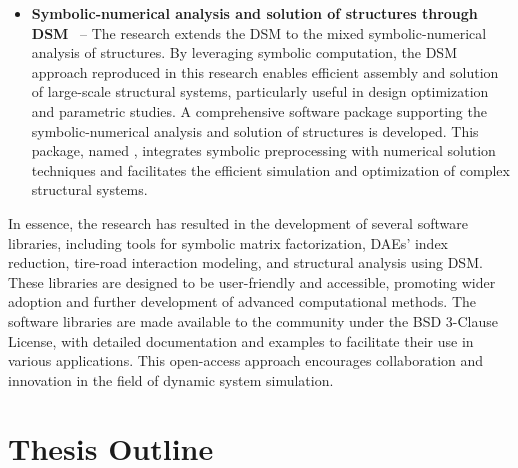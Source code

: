 \begin{itemize}
  \item \textbf{Symbolic-numerical analysis and solution of structures through \ac{DSM}}~\cite{trussme, stocco2024trussme, larcher2024imece_symbolic} -- The research extends the \ac{DSM} to the mixed symbolic-numerical analysis of structures. By leveraging symbolic computation, the \ac{DSM} approach reproduced in this research enables efficient assembly and solution of large-scale structural systems, particularly useful in design optimization and parametric studies. A comprehensive software package supporting the symbolic-numerical analysis and solution of structures is developed. This package, named \TrussMe{}, integrates symbolic preprocessing with numerical solution techniques and facilitates the efficient simulation and optimization of complex structural systems.
\end{itemize}
%
In essence, the research has resulted in the development of several software libraries, including tools for symbolic matrix factorization, \acp{DAE}' index reduction, tire-road interaction modeling, and structural analysis using \ac{DSM}. These libraries are designed to be user-friendly and accessible, promoting wider adoption and further development of advanced computational methods. The software libraries are made available to the community under the \ac{BSD} 3-Clause License, with detailed documentation and examples to facilitate their use in various applications. This open-access approach encourages collaboration and innovation in the field of dynamic system simulation.


\section{Thesis Outline}

